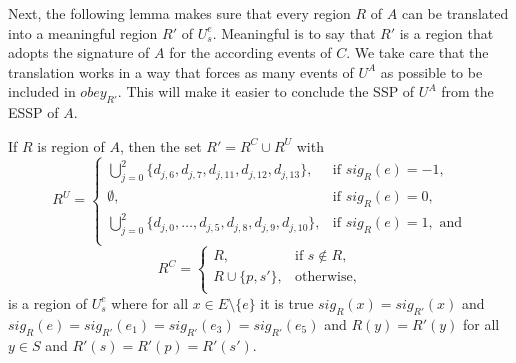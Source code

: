 \documentclass[english]{lipics_hacked}
\begin{document}
Next, the following lemma makes sure that every region $R$ of $A$ can be translated into a meaningful region $R'$ of $U^e_s$.
Meaningful is to say that $R'$ is a region that adopts the signature of $A$ for the according events of $C$.
We take care that the translation works in a way that forces as many events of $U^A$ as possible to be included in $obey_{R'}$.
This will make it easier to conclude the SSP of $U^A$ from the ESSP of $A$.
%
\begin{lemma}
\label{lem:region_translation}
If $R$ is region of $A$, then the set $R' = R^C \cup R^U$ with
%
\[R^U= \begin{cases}
\bigcup_{j = 0}^2 \{d_{j,6}, d_{j,7}, d_{j,11}, d_{j,12}, d_{j,13}\}, & \text{if } sig_R(e) = -1,\\
\emptyset,  & \text{if } sig_R(e) = 0,\\
\bigcup_{j = 0}^2 \{d_{j,0}, \dots,  d_{j,5}, d_{j,8}, d_{j,9}, d_{j,10}\}, & \text{if } sig_R(e) = 1, \text{ and}\\
\end{cases}\]
%
\[R^C= \begin{cases}
R, & \text{if } s \not\in R,\\
R \cup \{p,s'\}, & \text{otherwise,}\\
\end{cases}\]
%
is a region of $U^e_s$ where for all $x \in E \setminus \{e\}$ it is true $sig_R(x) = sig_{R'}(x)$ and $sig_R(e) = sig_{R'}(e_1) = sig_{R'}(e_3) = sig_{R'}(e_5)$ and $R(y) = R'(y)$ for all $y \in S$ and $R'(s) = R'(p) = R'(s')$.
\end{lemma}
%
\end{document}
